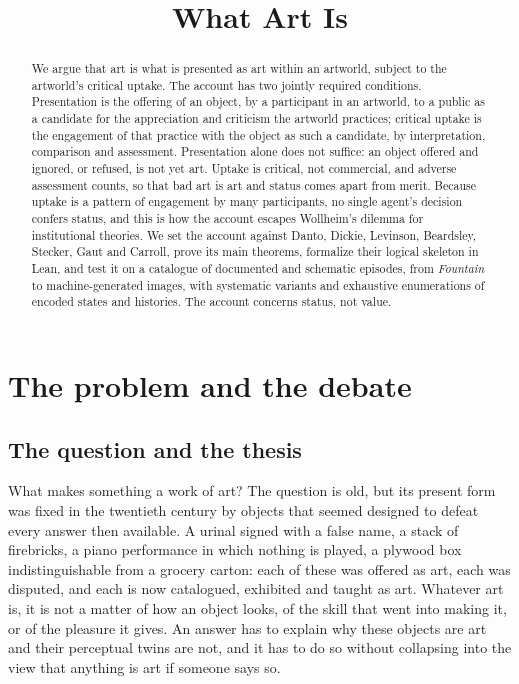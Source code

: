 \documentclass{situationist-preprint}
\title{What Art Is}
\begin{document}
\maketitle

\begin{abstract}
We argue that art is what is presented as art within an artworld, subject to the artworld's critical uptake. The account has two jointly required conditions. Presentation is the offering of an object, by a participant in an artworld, to a public as a candidate for the appreciation and criticism the artworld practices; critical uptake is the engagement of that practice with the object as such a candidate, by interpretation, comparison and assessment. Presentation alone does not suffice: an object offered and ignored, or refused, is not yet art. Uptake is critical, not commercial, and adverse assessment counts, so that bad art is art and status comes apart from merit. Because uptake is a pattern of engagement by many participants, no single agent's decision confers status, and this is how the account escapes Wollheim's dilemma for institutional theories. We set the account against Danto, Dickie, Levinson, Beardsley, Stecker, Gaut and Carroll, prove its main theorems, formalize their logical skeleton in Lean, and test it on a catalogue of \stnepisodes{} documented and schematic episodes, from \emph{Fountain} to machine-generated images, with systematic variants and exhaustive enumerations of encoded states and histories. The account concerns status, not value.
\end{abstract}

\section{The problem and the debate}\label{s:problem}

\subsection{The question and the thesis}

What makes something a work of art? The question is old, but its present form was fixed in the twentieth century by objects that seemed designed to defeat every answer then available. A urinal signed with a false name, a stack of firebricks, a piano performance in which nothing is played, a plywood box indistinguishable from a grocery carton: each of these was offered as art, each was disputed, and each is now catalogued, exhibited and taught as art. Whatever art is, it is not a matter of how an object looks, of the skill that went into making it, or of the pleasure it gives. An answer has to explain why these objects are art and their perceptual twins are not, and it has to do so without collapsing into the view that anything is art if someone says so.
\end{document}
